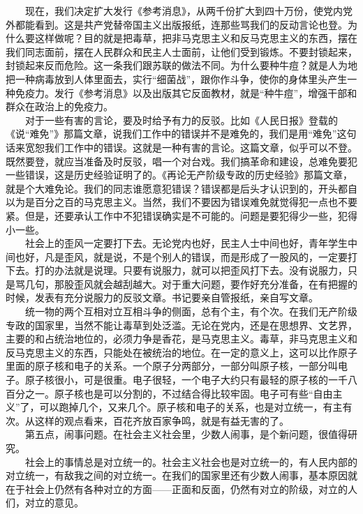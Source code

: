 \documentclass[cn,11pt,chinese]{elegantbook}
\begin{document}
　　现在，我们决定扩大发行《参考消息》，从两千份扩大到四十万份，使党内党外都能看到。这是共产党替帝国主义出版报纸，连那些骂我们的反动言论也登。为什么要这样做呢？目的就是把毒草，把非马克思主义和反马克思主义的东西，摆在我们同志面前，摆在人民群众和民主人士面前，让他们受到锻炼。不要封锁起来，封锁起来反而危险。这一条我们跟苏联的做法不同。为什么要种牛痘？就是人为地把一种病毒放到人体里面去，实行“细菌战”，跟你作斗争，使你的身体里头产生一种免疫力。发行《参考消息》以及出版其它反面教材，就是“种牛痘”，增强干部和群众在政治上的免疫力。\\
　　对于一些有害的言论，要及时给予有力的反驳。比如《人民日报》登载的《说“难免”》那篇文章，说我们工作中的错误并不是难免的，我们是用“难免”这句话来宽恕我们工作中的错误。这就是一种有害的言论。这篇文章，似乎可以不登。既然要登，就应当准备及时反驳，唱一个对台戏。我们搞革命和建设，总难免要犯一些错误，这是历史经验证明了的。《再论无产阶级专政的历史经验》那篇文章，就是个大难免论。我们的同志谁愿意犯错误？错误都是后头才认识到的，开头都自以为是百分之百的马克思主义。当然，我们不要因为错误难免就觉得犯一点也不要紧。但是，还要承认工作中不犯错误确实是不可能的。问题是要犯得少一些，犯得小一些。\\
　　社会上的歪风一定要打下去。无论党内也好，民主人士中间也好，青年学生中间也好，凡是歪风，就是说，不是个别人的错误，而是形成了一股风的，一定要打下去。打的办法就是说理。只要有说服力，就可以把歪风打下去。没有说服力，只是骂几句，那股歪风就会越刮越大。对于重大问题，要作好充分准备，在有把握的时候，发表有充分说服力的反驳文章。书记要亲自管报纸，亲自写文章。\\
　　统一物的两个互相对立互相斗争的侧面，总有个主，有个次。在我们无产阶级专政的国家里，当然不能让毒草到处泛滥。无论在党内，还是在思想界、文艺界，主要的和占统治地位的，必须力争是香花，是马克思主义。毒草，非马克思主义和反马克思主义的东西，只能处在被统治的地位。在一定的意义上，这可以比作原子里面的原子核和电子的关系。一个原子分两部分，一部分叫原子核，一部分叫电子。原子核很小，可是很重。电子很轻，一个电子大约只有最轻的原子核的一千八百分之一。原子核也是可以分割的，不过结合得比较牢固。电子可有些“自由主义”了，可以跑掉几个，又来几个。原子核和电子的关系，也是对立统一，有主有次。从这样的观点看来，百花齐放百家争鸣，就是有益无害的了。\\
　　第五点，闹事问题。在社会主义社会里，少数人闹事，是个新问题，很值得研究。\\
　　社会上的事情总是对立统一的。社会主义社会也是对立统一的，有人民内部的对立统一，有敌我之间的对立统一。在我们的国家里还有少数人闹事，基本原因就在于社会上仍然有各种对立的方面——正面和反面，仍然有对立的阶级，对立的人们，对立的意见。\\
\end{document}
